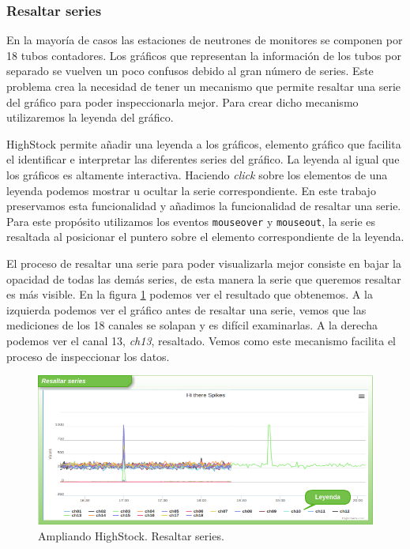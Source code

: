 		\subsubsection{Resaltar series}
			En la mayoría de casos las estaciones de neutrones de monitores se componen por 18 tubos contadores. Los gráficos que
			representan la información de los tubos por separado se vuelven un poco confusos debido al gran número de series. Este
			problema crea la necesidad de tener un mecanismo que permite resaltar una serie del gráfico para poder inspeccionarla mejor.
			Para crear dicho mecanismo utilizaremos la leyenda del gráfico.
			\par
			HighStock permite añadir una leyenda a los gráficos, elemento gráfico que facilita el identificar e interpretar las diferentes
			series del gráfico. La leyenda al igual que los gráficos es altamente interactiva. Haciendo \emph{click} sobre los elementos
			de una leyenda podemos mostrar u ocultar la serie correspondiente. En este trabajo preservamos esta funcionalidad y añadimos
			la funcionalidad de resaltar una serie. Para este propósito utilizamos los eventos \texttt{mouseover} y \texttt{mouseout}, la
			serie es resaltada al posicionar el puntero sobre el elemento correspondiente de la leyenda. 
			\par
			El proceso de resaltar una serie para poder visualizarla mejor consiste en bajar la opacidad de todas las demás series, de
			esta manera la serie que queremos resaltar es más visible. En la figura \ref{fig:resalto} podemos ver el resultado que
			obtenemos. A la izquierda podemos ver el gráfico antes de resaltar una serie, vemos que las mediciones de los 18 canales se
			solapan y es difícil examinarlas. A la derecha podemos ver el canal 13, \emph{ch13}, resaltado. Vemos como este mecanismo
			facilita el proceso de inspeccionar los datos.
			\begin{figure}[h]
				\centering
				\includegraphics[keepaspectratio, width=1\textwidth]{./img/resalto.png}
				\caption{Ampliando HighStock. Resaltar series.}   
				\label{fig:resalto}
			\end{figure}
	
